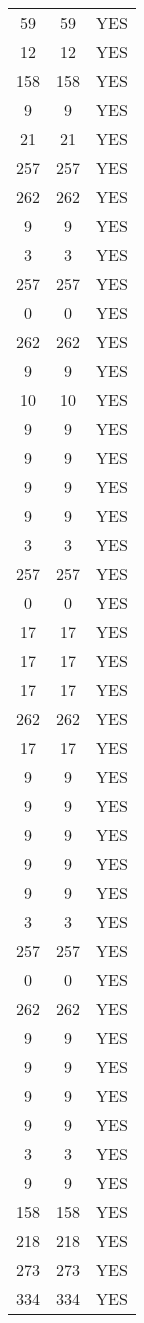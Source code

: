 \documentclass{report}
\begin{document}
\begin{spacing}{1.5}
\begin{longtable}{|c|c|c|}
 59 &  59 & YES \\
 12 &  12 & YES \\
158 & 158 & YES \\
  9 &   9 & YES \\
 21 &  21 & YES \\
257 & 257 & YES \\
262 & 262 & YES \\
  9 &   9 & YES \\
  3 &   3 & YES \\
257 & 257 & YES \\
  0 &   0 & YES \\
262 & 262 & YES \\
  9 &   9 & YES \\
 10 &  10 & YES \\
  9 &   9 & YES \\
  9 &   9 & YES \\
  9 &   9 & YES \\
  9 &   9 & YES \\
  3 &   3 & YES \\
257 & 257 & YES \\
  0 &   0 & YES \\
 17 &  17 & YES \\
 17 &  17 & YES \\
 17 &  17 & YES \\
262 & 262 & YES \\
 17 &  17 & YES \\
  9 &   9 & YES \\
  9 &   9 & YES \\
  9 &   9 & YES \\
  9 &   9 & YES \\
  9 &   9 & YES \\
  3 &   3 & YES \\
257 & 257 & YES \\
  0 &   0 & YES \\
262 & 262 & YES \\
  9 &   9 & YES \\
  9 &   9 & YES \\
  9 &   9 & YES \\
  9 &   9 & YES \\
  3 &   3 & YES \\
  9 &   9 & YES \\
158 & 158 & YES \\
218 & 218 & YES \\
273 & 273 & YES \\
334 & 334 & YES \\

\end{longtable}
\end{spacing}
\end{document}
